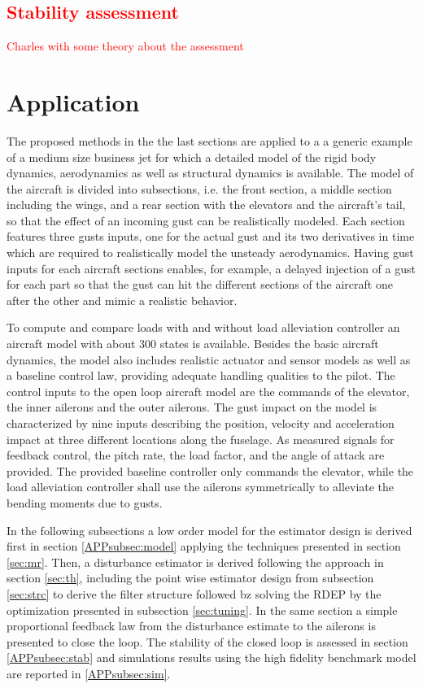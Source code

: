 \documentclass[graybox]{svmult}
\begin{document}
\textcolor{red}{
\section{Stability assessment}\label{sec:st}
Charles with some theory about the assessment
}

\section{Application}\label{sec:app}
The proposed methods in the the last sections are applied to a a generic example of a medium size business jet 
for which a detailed model of the rigid body dynamics, aerodynamics as well as structural dynamics is available.
The model of the aircraft is divided into subsections, i.e. the front section, a middle section including the wings, and a rear section with the elevators and the aircraft's tail, so that the effect of an incoming gust can be realistically modeled. Each section features three gusts inputs, one for the actual gust and its two derivatives in time which are required to realistically model the unsteady aerodynamics. Having  gust inputs for each aircraft sections enables, for example, a delayed injection of a gust for each part  so that the gust can hit the different sections of the aircraft one after the other and mimic a realistic behavior.
 
To  compute and compare loads with  and without load alleviation controller an aircraft model with about 300 states  is available. Besides the basic aircraft dynamics, the model also includes realistic actuator and sensor models as well as a baseline control law, providing adequate handling qualities to the pilot.
The control inputs to the open loop aircraft model are the  commands of the elevator, the inner ailerons and the outer ailerons. 
The gust impact on the model is characterized by  nine inputs describing the position, velocity and acceleration impact at three different locations along the fuselage.
As measured signals for feedback control, the pitch rate, the load factor,  and the angle of attack are provided.
The provided baseline controller only commands the elevator, while  the load alleviation controller shall use the ailerons symmetrically to alleviate the bending moments due to gusts.

In the following subsections a low order model for the estimator design is derived first in section \ref{APPsubsec:model}  applying the techniques presented in section
\ref{sec:mr}. Then, a disturbance estimator is derived following the approach in section \ref{sec:th}, including the point wise estimator design from subsection \ref{sec:strc} to derive the filter structure followed bz solving the RDEP by the optimization presented in subsection \ref{sec:tuning}. In the same section a simple proportional feedback law from the disturbance estimate to the ailerons is presented to close the loop.
The stability of the closed loop is assessed in section \ref{APPsubsec:stab} and simulations results using the high fidelity benchmark model are reported in \ref{APPsubsec:sim}.
\end{document}
